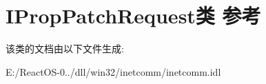 \hypertarget{class_i_prop_patch_request}{}\section{I\+Prop\+Patch\+Request类 参考}
\label{class_i_prop_patch_request}


该类的文档由以下文件生成\+:\begin{DoxyCompactItemize}
\item 
E\+:/\+React\+O\+S-\/0../dll/win32/inetcomm/inetcomm.\+idl\end{DoxyCompactItemize}

